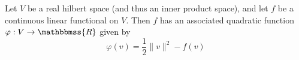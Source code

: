 \documentclass[12pt]{article}
\newcommand{\R}{\mathbbmss{R}}
\begin{document}
Let $V$ be a real hilbert space (and thus an inner product space), and 
let $f$ be a continuous linear functional on $V$. Then $f$ has an associated quadratic function $\varphi:V\to\R$
given by
\[\varphi(v)=\frac{1}{2}\|v\|^2-f(v)\]
\end{document}
